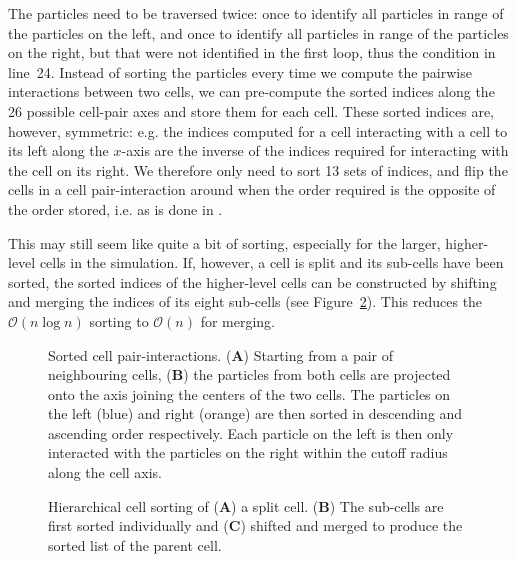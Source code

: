 \documentclass[final]{siamltex}
\newcommand{\oh}[1]
    {\mbox{$ {\mathcal O}( #1 ) $}}
\newcommand{\fig}[1]
    {Figure~\ref{fig:#1}}
\newcommand{\bsf}[1]
    {\textbf{\textsf{#1}}}
\begin{document}
The particles need to be traversed twice: once to identify
all particles in range of the particles on the left, and
once to identify all particles in range of the particles on the
right, but that were not identified in the first loop,
thus the condition in line~24.
Instead of sorting the particles every time we compute the
pairwise interactions between two cells, we can pre-compute
the sorted indices along the 26 possible cell-pair axes and
store them for each cell.
These sorted indices are, however, symmetric: e.g. the indices
computed for a cell interacting with a cell to its left along the
$x$-axis are the inverse of the indices required for interacting 
with the cell on its right.
We therefore only need to sort 13 sets of indices, and flip
the cells in a cell pair-interaction around when the order
required is the opposite of the order stored, i.e. as is
done in \cite{ref:Gonnet2013}.

This may still seem like quite a bit of sorting, especially
for the larger, higher-level cells in the simulation.
If, however, a cell is split and its sub-cells have been sorted,
the sorted indices of the higher-level cells can be constructed
by shifting and merging the indices of its eight sub-cells
(see \fig{HierarchySorting}).
This reduces the \oh{n\log{n}} sorting to \oh{n} for merging. 


\begin{figure}
    \centerline{}
    
    \caption{Sorted cell pair-interactions. ({\bsf A}) Starting from a pair of
        neighbouring cells, ({\bsf B}) the particles from both cells
        are projected onto the axis joining the centers of the two cells.
        The particles on the left (blue) and right (orange) are
        then sorted in descending and ascending order respectively.
        Each particle on the left is then only interacted with
        the particles on the right within the cutoff radius along the cell axis.
        }
    \label{fig:SortedInteractions}
\end{figure}


\begin{figure}
    \centerline{}
    
    \caption{Hierarchical cell sorting of ({\bsf A}) a split cell.
        ({\bsf B}) The sub-cells are first sorted individually and
        ({\bsf C}) shifted and merged to produce the sorted list
        of the parent cell.
        }
    \label{fig:HierarchySorting}
\end{figure}
\end{document}
